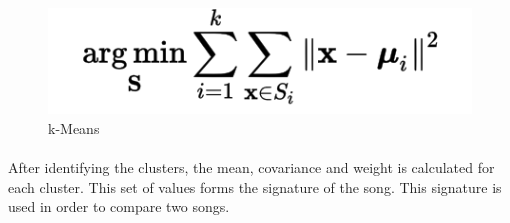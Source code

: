 \documentclass[12pt]{article}
\begin{document}
\begin{figure}[h]\label{kmeans}
\center
\includegraphics[scale=0.8]{fig2.png}
\caption{k-Means}
\end{figure}

\paragraph{}
After identifying the clusters, the mean, covariance and weight is calculated for each cluster. This set of values forms the signature of the song. This signature is used in order to compare two songs.
\end{document}
